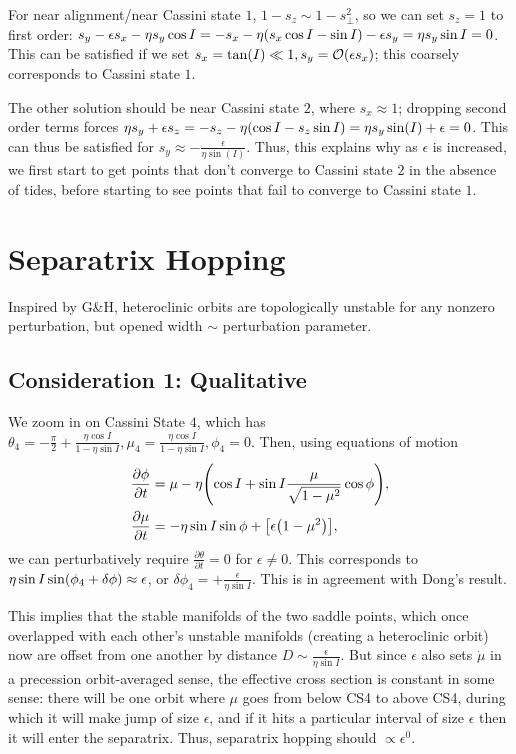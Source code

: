 \documentclass[11pt,
        usenames, %
        dvipsnames %
    ]{article}
\newcommand*{\pd}[2]{\frac{\partial#1}{\partial#2}}
\DeclarePairedDelimiter\p{\lparen}{\rparen}
\DeclarePairedDelimiter\s{\lbrack}{\rbrack}
\begin{document}
For near alignment/near Cassini state $1$, $1 - s_z \sim 1 - s_{\perp}^2$, so we
can set $s_z = 1$ to first order: $s_y - \epsilon s_x - \eta s_y \cos I = -s_x -
\eta\p*{s_x \cos I - \sin I} - \epsilon s_y = \eta s_y \sin I = 0$. This can be
satisfied if we set $s_x = \tan(I) \ll 1, s_y = \mathcal{O}\p*{\epsilon s_x}$;
this coarsely corresponds to Cassini state $1$.

The other solution should be near Cassini state $2$, where $s_x \approx 1$;
dropping second order terms forces $\eta s_y + \epsilon s_z = -s_z -
\eta\p*{\cos I - s_z\sin I} = \eta s_y \sin(I) + \epsilon = 0$. This can thus be
satisfied for $s_y \approx -\frac{\epsilon}{\eta \sin(I)}$. Thus, this explains
why as $\epsilon$ is increased, we first start to get points that don't converge
to Cassini state $2$ in the absence of tides, before starting to see points that
fail to converge to Cassini state $1$.

\section{Separatrix Hopping}

Inspired by G\&H, heteroclinic orbits are topologically unstable for any nonzero
perturbation, but opened width $\sim$ perturbation parameter.

\subsection{Consideration 1: Qualitative}

We zoom in on Cassini State $4$, which has $\theta_4 =
-\frac{\pi}{2} + \frac{\eta \cos I}{1 - \eta \sin I}, \mu_4 = \frac{\eta \cos
I}{1 - \eta \sin I}, \phi_4 = 0$. Then, using
equations of motion
\begin{align}
    \pd{\phi}{t} &= \mu - \eta\p*{\cos I + \sin I \frac{\mu}{\sqrt{1 - \mu^2}}
        \cos \phi} ,\\
    \pd{\mu}{t} &= -\eta \sin I \sin \phi + \s*{\epsilon \p*{1 - \mu^2}},
\end{align}
we can perturbatively require $\pd{\theta}{t} = 0$ for $\epsilon \neq 0$. This
corresponds to $\eta \sin I \sin \p*{\phi_4 + \delta \phi} \approx \epsilon$, or
$\delta \phi_4 = +\frac{\epsilon}{\eta \sin I}$. This is in agreement with
Dong's result.

This implies that the stable manifolds of the two saddle points, which once
overlapped with each other's unstable manifolds (creating a heteroclinic orbit)
now are offset from one another by distance $D \sim \frac{\epsilon}{\eta \sin
I}$. But since $\epsilon$ also sets $\dot{\mu}$ in a precession orbit-averaged
sense, the effective cross section is constant in some sense: there will be one
orbit where $\mu$ goes from below CS4 to above CS4, during which it will make
jump of size $\epsilon$, and if it hits a particular interval of size $\epsilon$
then it will enter the separatrix. Thus, separatrix hopping should $\propto
\epsilon^0$.
\end{document}
